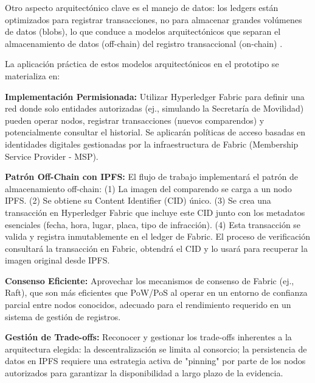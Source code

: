 Otro aspecto arquitectónico clave es el manejo de datos: los ledgers están optimizados para registrar transacciones, no para almacenar grandes volúmenes de datos (blobs), lo que conduce a modelos arquitectónicos que separan el almacenamiento de datos (off-chain) del registro transaccional (on-chain) \parencite{xu2019taxonomy}. 

La aplicación práctica de estos modelos arquitectónicos en el prototipo se materializa en: 

\textbf{Implementación Permisionada: }Utilizar Hyperledger Fabric para definir una red donde solo entidades autorizadas (ej., simulando la Secretaría de Movilidad) pueden operar nodos, registrar transacciones (nuevos comparendos) y potencialmente consultar el historial. Se aplicarán políticas de acceso basadas en identidades digitales gestionadas por la infraestructura de Fabric (Membership Service Provider - MSP). 

\textbf{Patrón Off-Chain con IPFS: } El flujo de trabajo implementará el patrón de almacenamiento off-chain: (1) La imagen del comparendo se carga a un nodo IPFS. (2) Se obtiene su Content Identifier (CID) único. (3) Se crea una transacción en Hyperledger Fabric que incluye este CID junto con los metadatos esenciales (fecha, hora, lugar, placa, tipo de infracción). (4) Esta transacción se valida y registra inmutablemente en el ledger de Fabric. El proceso de verificación consultará la transacción en Fabric, obtendrá el CID y lo usará para recuperar la imagen original desde IPFS. 

\textbf{Consenso Eficiente:} Aprovechar los mecanismos de consenso de Fabric (ej., Raft), que son más eficientes que PoW/PoS al operar en un entorno de confianza parcial entre nodos conocidos, adecuado para el rendimiento requerido en un sistema de gestión de registros. 

\textbf{Gestión de Trade-offs:} Reconocer y gestionar los trade-offs inherentes a la arquitectura elegida: la descentralización se limita al consorcio; la persistencia de datos en IPFS requiere una estrategia activa de "pinning" por parte de los nodos autorizados para garantizar la disponibilidad a largo plazo de la evidencia. 
 
